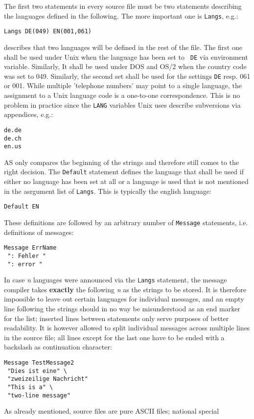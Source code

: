 \documentclass[12pt,twoside]{report}
\newcommand{\asname}{{AS}}
\begin{document}
The first two statements in every source file must be two statements
describing the languages defined in the following.  The more important one
is {\tt Langs}, e.g.:
\begin{verbatim}
Langs DE(049) EN(001,061)
\end{verbatim}
describes that two languages will be defined in the rest of the file.  The
first one shall be used under Unix when the language has been set to {\tt
DE} via environment variable.  Similarly, It shall be used under DOS and
OS/2 when the country code was set to 049.  Similarly, the second set
shall be used for the settings {\tt DE} resp. 061 or 001.  While multiple
'telephone numbers' may point to a single language, the assignment to a
Unix language code is a one-to-one correspondence.  This is no problem in
practice since the {\tt LANG} variables Unix uses describe subversions via
appendices, e.g.:
\begin{verbatim}
de.de
de.ch
en.us
\end{verbatim}
\asname{} only compares the beginning of the strings and therefore still comes to
the right decision.
The {\tt Default} statement defines the language that shall be used if
either no language has been set at all or a language is used that is not
mentioned in the asrgument list of {\tt Langs}.  This is typically the
english language:
\begin{verbatim}
Default EN
\end{verbatim}
These definitions are followed by an arbitrary number of {\tt Message}
statements, i.e. definitions of messages:
\begin{verbatim}
Message ErrName
 ": Fehler "
 ": error "
\end{verbatim}
In case {\em n} languages were announced via the {\tt Langs} statement,
the message compiler takes {\bf exactly} the following {\em n} as the
strings to be stored.  It is therefore impossible to leave out certain
languages for individual messages, and an empty line following the strings
should in no way be misunderstood as an end marker for the list; inserted
lines between statements only serve purposes of better readability.  It is
however allowed to split individual messages across multiple lines in the
source file; all lines except for the last one have to be ended with a
backslash as continuation character:
\begin{verbatim}
Message TestMessage2
 "Dies ist eine" \
 "zweizeilige Nachricht"
 "This is a" \
 "two-line message"
\end{verbatim}
As already mentioned, source files are pure ASCII files; national special
\end{document}
